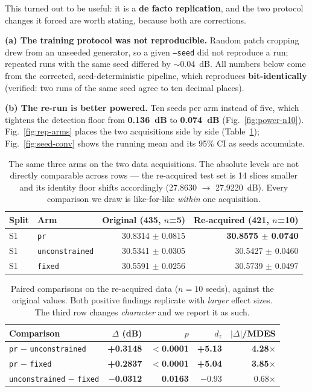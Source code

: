 \documentclass[conference]{IEEEtran}
\begin{document}
This turned out to be useful: it is a \textbf{de facto replication}, and the two
protocol changes it forced are worth stating, because both are corrections.

\textbf{(a) The training protocol was not reproducible.} Random patch cropping
drew from an unseeded generator, so a given \texttt{--seed} did not reproduce a
run; repeated runs with the same seed differed by $\sim$0.04~dB. All numbers below
come from the corrected, seed-deterministic pipeline, which reproduces
\textbf{bit-identically} (verified: two runs of the same seed agree to ten decimal
places).

\textbf{(b) The re-run is better powered.} Ten seeds per arm instead of five,
which tightens the detection floor from \textbf{0.136~dB} to \textbf{0.074~dB}
(Fig.~\ref{fig:power-n10}). Fig.~\ref{fig:rep-arms} places the two acquisitions
side by side (Table~\ref{tab:repl-arms}); Fig.~\ref{fig:seed-conv} shows the
running mean and its 95\% CI as seeds accumulate.

\begin{table}[t]
\centering
\caption{The same three arms on the two data acquisitions. The absolute levels are
not directly comparable across rows --- the re-acquired test set is 14 slices
smaller and its identity floor shifts accordingly (27.8630 $\to$ 27.9220~dB).
Every comparison we draw is like-for-like \emph{within} one acquisition.}
\label{tab:repl-arms}
\small
\begin{tabular}{@{}llrr@{}}
\toprule
Split & Arm & Original (435, $n$=5) & Re-acquired (421, $n$=10)\\
\midrule
S1 & \texttt{pr} & 30.8314 $\pm$ 0.0815 & \textbf{30.8575 $\pm$ 0.0740}\\
S1 & \texttt{unconstrained} & 30.5341 $\pm$ 0.0305 & 30.5427 $\pm$ 0.0460\\
S1 & \texttt{fixed} & 30.5591 $\pm$ 0.0256 & 30.5739 $\pm$ 0.0497\\
\bottomrule
\end{tabular}
\end{table}

\begin{table}[t]
\centering
\caption{Paired comparisons on the re-acquired data ($n=10$ seeds), against the
original values. Both positive findings replicate with \emph{larger} effect
sizes. The third row changes \emph{character} and we report it as such.}
\label{tab:repl-paired}
\small
\begin{tabular}{@{}lrrrr@{}}
\toprule
Comparison & $\Delta$ (dB) & $p$ & $d_z$ & $|\Delta|$/MDES\\
\midrule
\texttt{pr} $-$ \texttt{unconstrained} & \textbf{+0.3148} & \textbf{$<$0.0001} & \textbf{+5.13} & \textbf{4.28}$\times$\\
\texttt{pr} $-$ \texttt{fixed} & \textbf{+0.2837} & \textbf{$<$0.0001} & \textbf{+5.04} & \textbf{3.85}$\times$\\
\texttt{unconstrained} $-$ \texttt{fixed} & \textbf{$-$0.0312} & \textbf{0.0163} & $-$0.93 & 0.68$\times$\\
\bottomrule
\end{tabular}
\end{table}
\end{document}
